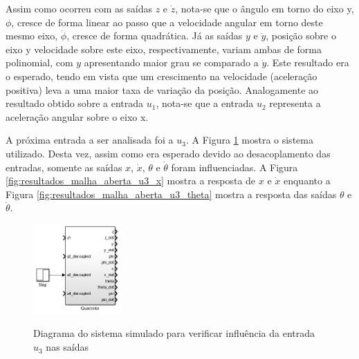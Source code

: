 Assim como ocorreu com as saídas $z$ e $\dot{z}$, nota-se que o ângulo em torno do eixo y, $\phi$, cresce de forma linear ao passo que a velocidade angular em torno deste mesmo eixo, $\dot{\phi}$, cresce de forma quadrática. Já as saídas $y$ e $\dot{y}$, posição sobre o eixo y velocidade sobre este eixo, respectivamente, variam ambas de forma polinomial, com $y$ apresentando maior grau se comparado a $\dot{y}$. Este resultado era o esperado, tendo em vista que um crescimento na velocidade (aceleração positiva) leva a uma maior taxa de variação da posição. Analogamente ao resultado obtido sobre a entrada $u_1$, nota-se que a entrada $u_2$ representa a aceleração angular sobre o eixo x.

A próxima entrada a ser analisada foi a $u_3$. A Figura \ref{fig:resultados_bloco_quadrotor_entrada_u3} mostra o sistema utilizado. Desta vez, assim como era esperado devido ao desacoplamento das entradas, somente as saídas $x$, $\dot{x}$, $\theta$ e $\dot{\theta}$ foram influenciadas. A Figura \ref{fig:resultados_malha_aberta_u3_x} mostra a resposta de $x$ e $\dot{x}$ enquanto a Figura \ref{fig:resultados_malha_aberta_u3_theta} mostra a resposta das saídas $\theta$ e $\dot{\theta}$.

\begin{figure}[!htb]
    \centering
    \caption{Diagrama do sistema simulado para verificar influência da entrada $u_3$ nas saídas}
    \includegraphics[width=0.3\textwidth]{./04-figuras/resultados/malha_aberta/resultados_bloco_quadrotor_entrada_u3}
    \label{fig:resultados_bloco_quadrotor_entrada_u3}
\end{figure}

